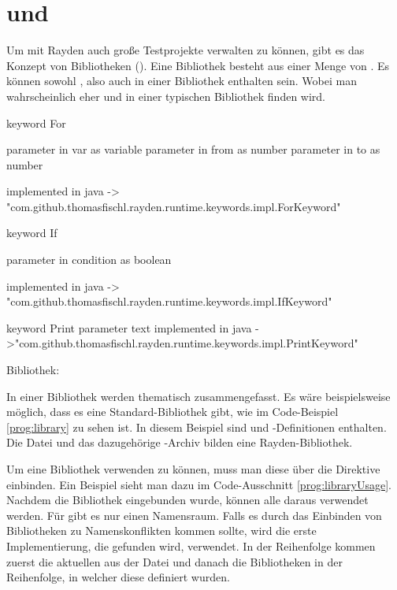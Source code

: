 \section{ und }

Um mit Rayden auch große Testprojekte verwalten zu können, gibt es das Konzept von Bibliotheken (). Eine Bibliothek besteht aus einer Menge von . Es können sowohl ,  also auch  in einer Bibliothek enthalten sein. Wobei man wahrscheinlich eher  und  in einer typischen Bibliothek finden wird.  

\begin{program}
\begin{JavaCode}
keyword For { 
	parameter in var as variable
	parameter in from as number
	parameter in to as number

	implemented in java -> "com.github.thomasfischl.rayden.runtime.keywords.impl.ForKeyword"
}

keyword If { 
	parameter in condition as boolean

	implemented in java -> "com.github.thomasfischl.rayden.runtime.keywords.impl.IfKeyword"
}

keyword Print {
	parameter text
	implemented in java ->"com.github.thomasfischl.rayden.runtime.keywords.impl.PrintKeyword"
}
\end{JavaCode}
\caption{Bibliothek: }
\label{prog:library}
\end{program}

\SuperPar
In einer Bibliothek werden  thematisch zusammengefasst. Es wäre beispielsweise möglich, dass es eine Standard-Bibliothek gibt, wie im Code-Beispiel \ref{prog:library} zu sehen ist. In diesem Beispiel sind  und -Definitionen enthalten. Die Datei  und das dazugehörige -Archiv bilden eine Rayden-Bibliothek. 

\SuperPar
Um eine Bibliothek verwenden zu können, muss man diese über die Direktive  einbinden. Ein Beispiel sieht man dazu im Code-Ausschnitt \ref{prog:libraryUsage}. Nachdem die Bibliothek eingebunden wurde, können alle  daraus verwendet werden. Für  gibt es nur einen Namensraum. Falls es durch das Einbinden von Bibliotheken zu Namenskonflikten kommen sollte, wird die erste Implementierung, die gefunden wird, verwendet. In der Reihenfolge kommen zuerst die aktuellen  aus der Datei und danach die Bibliotheken in der Reihenfolge, in welcher diese definiert wurden.

